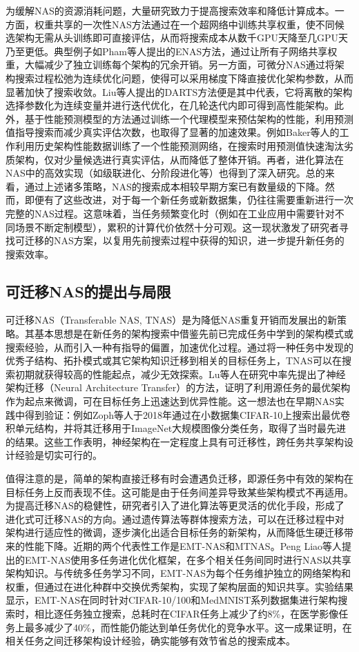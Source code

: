 \documentclass[../main.tex]{subfiles}
\begin{document}
为缓解NAS的资源消耗问题，大量研究致力于提高搜索效率和降低计算成本。一方面，权重共享的一次性NAS方法通过在一个超网络中训练共享权重，使不同候选架构无需从头训练即可直接评估，从而将搜索成本从数千GPU天降至几GPU天乃至更低。典型例子如Pham等人提出的ENAS方法，通过让所有子网络共享权重，大幅减少了独立训练每个架构的冗余开销。另一方面，可微分NAS通过将架构搜索过程松弛为连续优化问题，使得可以采用梯度下降直接优化架构参数，从而显著加快了搜索收敛。Liu等人提出的DARTS方法便是其中代表，它将离散的架构选择参数化为连续变量并进行迭代优化，在几轮迭代内即可得到高性能架构。此外，基于性能预测模型的方法通过训练一个代理模型来预估架构的性能，利用预测值指导搜索而减少真实评估次数，也取得了显著的加速效果。例如Baker等人的工作利用历史架构性能数据训练了一个性能预测网络，在搜索时用预测值快速淘汰劣质架构，仅对少量候选进行真实评估，从而降低了整体开销。再者，进化算法在NAS中的高效实现（如级联进化、分阶段进化等）也得到了深入研究。总的来看，通过上述诸多策略，NAS的搜索成本相较早期方案已有数量级的下降。然而，即便有了这些改进，对于每一个新任务或新数据集，仍往往需要重新进行一次完整的NAS过程。这意味着，当任务频繁变化时（例如在工业应用中需要针对不同场景不断定制模型），累积的计算代价依然十分可观。这一现状激发了研究者寻找可迁移的NAS方案，以复用先前搜索过程中获得的知识，进一步提升新任务的搜索效率。

\subsection{可迁移NAS的提出与局限}

可迁移NAS（Transferable NAS, TNAS）是为降低NAS重复开销而发展出的新策略。其基本思想是在新任务的架构搜索中借鉴先前已完成任务中学到的架构模式或搜索经验，从而引入一种有指导的偏置，加速优化过程。通过将一种任务中发现的优秀子结构、拓扑模式或其它架构知识迁移到相关的目标任务上，TNAS可以在搜索初期就获得较高的性能起点，减少无效探索。Lu等人在研究中率先提出了神经架构迁移（Neural Architecture Transfer）的方法，证明了利用源任务的最优架构作为起点来微调，可在目标任务上迅速达到优异性能。这一想法也在早期NAS实践中得到验证：例如Zoph等人于2018年通过在小数据集CIFAR-10上搜索出最优卷积单元结构，并将其迁移用于ImageNet大规模图像分类任务，取得了当时最先进的结果。这些工作表明，神经架构在一定程度上具有可迁移性，跨任务共享架构设计经验是切实可行的。

值得注意的是，简单的架构直接迁移有时会遭遇负迁移，即源任务中有效的架构在目标任务上反而表现不佳。这可能是由于任务间差异导致某些架构模式不再适用。为提高迁移NAS的稳健性，研究者引入了进化算法等更灵活的优化手段，形成了进化式可迁移NAS的方向。通过遗传算法等群体搜索方法，可以在迁移过程中对架构进行适应性的微调，逐步演化出适合目标任务的新架构，从而降低生硬迁移带来的性能下降。近期的两个代表性工作是EMT-NAS和MTNAS。Peng Liao等人提出的EMT-NAS使用多任务进化优化框架，在多个相关任务间同时进行NAS以共享架构知识。与传统多任务学习不同，EMT-NAS为每个任务维护独立的网络架构和权重，但通过在进化种群中交换优秀架构，实现了架构层面的知识共享。实验结果显示，EMT-NAS在同时针对CIFAR-10/100和MedMNIST系列数据集进行架构搜索时，相比逐任务独立搜索，总耗时在CIFAR任务上减少了约8\%，在医学影像任务上最多减少了40\%，而性能仍能达到单任务优化的竞争水平。这一成果证明，在相关任务之间迁移架构设计经验，确实能够有效节省总的搜索成本。
\end{document}
